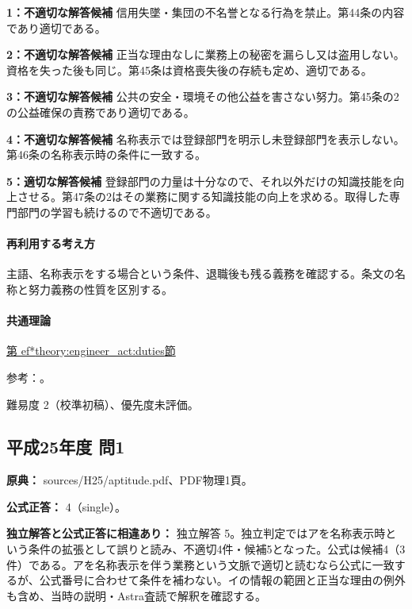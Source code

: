 \noindent\textbf{1：不適切な解答候補} 信用失墜・集団の不名誉となる行為を禁止。第44条の内容であり適切である。\par

\noindent\textbf{2：不適切な解答候補} 正当な理由なしに業務上の秘密を漏らし又は盗用しない。資格を失った後も同じ。第45条は資格喪失後の存続も定め、適切である。\par

\noindent\textbf{3：不適切な解答候補} 公共の安全・環境その他公益を害さない努力。第45条の2の公益確保の責務であり適切である。\par

\noindent\textbf{4：不適切な解答候補} 名称表示では登録部門を明示し未登録部門を表示しない。第46条の名称表示時の条件に一致する。\par

\noindent\textbf{5：適切な解答候補} 登録部門の力量は十分なので、それ以外だけの知識技能を向上させる。第47条の2はその業務に関する知識技能の向上を求める。取得した専門部門の学習も続けるので不適切である。\par

\paragraph{再利用する考え方} 主語、名称表示をする場合という条件、退職後も残る義務を確認する。条文の名称と努力義務の性質を区別する。

\paragraph{共通理論} \hyperref[theory:engineer_act:duties]{第
ef*{theory:engineer_act:duties}節}

\par 参考：\cite{engineer_act_current}。

\par 難易度 2（校準初稿）、優先度未評価。

\subsection{平成25年度 問1}
\label{q:h25-reg-apt-01}

\noindent\textbf{原典：} sources/H25/aptitude.pdf、PDF物理1頁。

\textbf{公式正答：} 4（single）。

\par\textbf{独立解答と公式正答に相違あり：} 独立解答 5。独立判定ではアを名称表示時という条件の拡張として誤りと読み、不適切4件・候補5となった。公式は候補4（3件）である。アを名称表示を伴う業務という文脈で適切と読むなら公式に一致するが、公式番号に合わせて条件を補わない。イの情報の範囲と正当な理由の例外も含め、当時の説明・Astra査読で解釈を確認する。

